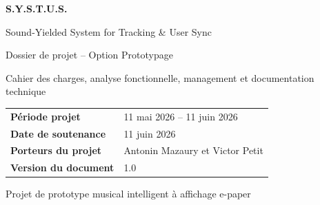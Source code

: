 \begin{titlepage}
    \centering
    \vspace*{2cm}

    {\Huge\bfseries S.Y.S.T.U.S.\par}
    \vspace{0.4cm}
    {\Large Sound-Yielded System for Tracking \& User Sync\par}

    \vspace{1.5cm}
    {\Large Dossier de projet -- Option Prototypage\par}
    \vspace{0.4cm}
    {\large Cahier des charges, analyse fonctionnelle, management et documentation technique\par}

    \vfill

    \begin{tabular}{>{\bfseries}p{5cm}p{8cm}}
        Période projet & 11 mai 2026 -- 11 juin 2026 \\
        Date de soutenance & 11 juin 2026 \\
        Porteurs du projet & Antonin Mazaury et Victor Petit \\
        Version du document & 1.0 \\
    \end{tabular}

    \vfill

    {\large Projet de prototype musical intelligent à affichage e-paper\par}
\end{titlepage}
